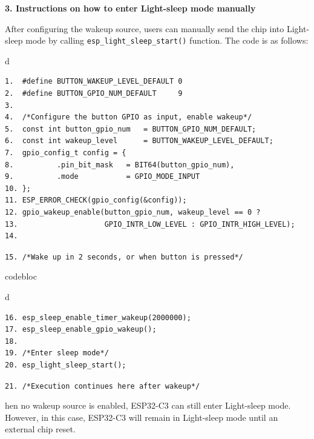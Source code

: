 \documentclass[a4paper,12pt,openany]{book}
\renewcommand{\ttfamily}{\fontfamily{pcr}\selectfont}
\renewcommand{\arraystretch}{1}
\newenvironment{codebloc}{ %
    \ttfamily\footnotesize
    \renewcommand{\arraystretch}{1}
}
\newcommand{\note}[2][NOTE]{ %
\vspace{6pt}
\begin{tabular}{b{\textwidth}}
\hline
\fontfamily{phv}\selectfont \textbf{#1}\\
\leftskip 1em #2\\
\hline
\end{tabular}
}
\begin{document}

\textbf{3. Instructions on how to enter Light-sleep mode manually}

After configuring the wakeup source, users can manually send the chip into Light-sleep mode by calling \verb|esp_light_sleep_start()| function. The code is as follows:

\begin{codebloc}
\begin{tabular}{d}
\vspace{2pt}
\begin{verbatim}
1.  #define BUTTON_WAKEUP_LEVEL_DEFAULT 0
2.  #define BUTTON_GPIO_NUM_DEFAULT     9
3.
4.  /*Configure the button GPIO as input, enable wakeup*/
5.  const int button_gpio_num   = BUTTON_GPIO_NUM_DEFAULT;
6.  const int wakeup_level      = BUTTON_WAKEUP_LEVEL_DEFAULT;
7.  gpio_config_t config = {
8.          .pin_bit_mask   = BIT64(button_gpio_num),
9.          .mode           = GPIO_MODE_INPUT
10. };
11. ESP_ERROR_CHECK(gpio_config(&config));
12. gpio_wakeup_enable(button_gpio_num, wakeup_level == 0 ?
13.                    GPIO_INTR_LOW_LEVEL : GPIO_INTR_HIGH_LEVEL);
14.
\end{verbatim}
\verb|15. /*Wake up in 2 seconds, or when button is pressed*/|
\end{tabular}
\end{codebloc}

\begin{codebloc}
\begin{tabular}{d}
\vspace{2pt}
\begin{verbatim}
16. esp_sleep_enable_timer_wakeup(2000000);
17. esp_sleep_enable_gpio_wakeup();
18.
19. /*Enter sleep mode*/
20. esp_light_sleep_start();
\end{verbatim}
\verb|21. /*Execution continues here after wakeup*/|
\end{tabular}
\end{codebloc}

When no wakeup source is enabled, ESP32-C3 can still enter Light-sleep mode. However, in this case, ESP32-C3 will remain in Light-sleep mode until an external chip reset.
\end{document}
